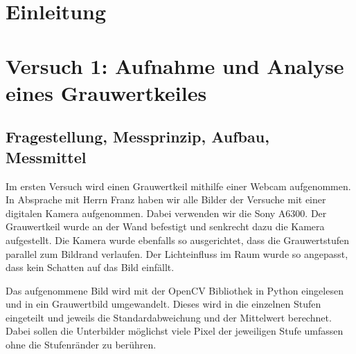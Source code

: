 \documentclass[12pt, oneside, a4paper, \docLanguage]{report}
\begin{document}

\setcounter{section}{0}



\clearpage

%
%


%
%


%
%


%
%




\setcounter{page}{1}
\pagestyle{default}
%
%
\chapter{Einleitung}
\label{chap:EINL}


%
%
\chapter{Versuch 1: Aufnahme und Analyse eines Grauwertkeiles}
\label{chap:VERSUCH_1}

\section{Fragestellung, Messprinzip, Aufbau, Messmittel}
\label{chap:VERSUCH_1_FRAGESTELLUNG}
Im ersten Versuch wird einen Grauwertkeil mithilfe einer Webcam aufgenommen. In Absprache mit Herrn Franz haben wir alle Bilder der Versuche mit einer digitalen Kamera aufgenommen. Dabei verwenden wir die Sony A6300. Der Grauwertkeil wurde an der Wand befestigt und senkrecht dazu die Kamera aufgestellt. Die Kamera wurde ebenfalls so ausgerichtet, dass die Grauwertstufen parallel zum Bildrand verlaufen. Der Lichteinfluss im Raum wurde so angepasst, dass kein Schatten auf das Bild einfällt.

Das aufgenommene Bild wird mit der OpenCV Bibliothek in Python eingelesen und in ein Grauwertbild umgewandelt. Dieses wird in die einzelnen Stufen eingeteilt und jeweils die Standardabweichung und der Mittelwert berechnet. Dabei sollen die Unterbilder möglichst viele Pixel der jeweiligen Stufe umfassen ohne die Stufenränder zu berühren.
\end{document}
